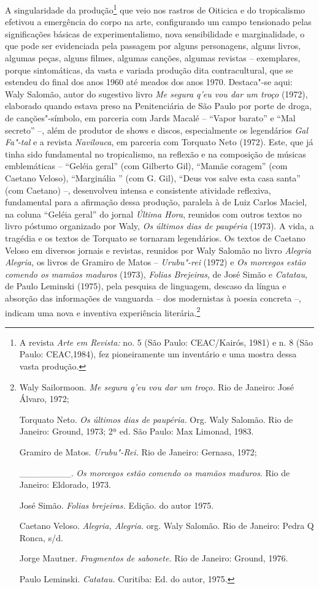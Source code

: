 A singularidade da produção\footnote{A revista \emph{Arte em Revista:}
  no. 5 (São Paulo: \textsc{CEAC}/Kairós, 1981) e n. 8 (São Paulo: \textsc{CEAC},1984),
  fez pioneiramente um inventário e uma mostra dessa vasta produção.}
que veio nos rastros de Oiticica e do tropicalismo efetivou a emergência
do corpo na arte, configurando um campo tensionado pelas significações
básicas de experimentalismo, nova sensibilidade e marginalidade, o que
pode ser evidenciada pela passagem por alguns personagens, alguns
livros, algumas peças, alguns filmes, algumas canções, algumas revistas
-- exemplares, porque sintomáticas, da vasta e variada produção dita
contracultural, que se estendeu do final dos anos 1960 até meados dos
anos 1970. Destaca"-se aqui: Waly Salomão, autor do sugestivo livro
\emph{Me segura q'eu vou dar um troço} (1972), elaborado quando
estava preso na Penitenciária de São Paulo por porte de droga, de
canções"-símbolo, em parceria com Jards Macalé -- ``Vapor barato'' e ``Mal
secreto'' --, além de produtor de shows e discos, especialmente os
legendários \emph{Gal Fa"-tal} e a revista \emph{Navilouca}, em parceria
com Torquato Neto (1972). Este, que já tinha sido fundamental no
tropicalismo, na reflexão e na composição de músicas emblemáticas --
``Geléia geral'' (com Gilberto Gil), ``Mamãe coragem'' (com Caetano
Veloso), ``Marginália '' (com G. Gil), ``Deus vos salve esta casa
santa'' (com Caetano) --, desenvolveu intensa e consistente atividade
reflexiva, fundamental para a afirmação dessa produção, paralela à de
Luiz Carlos Maciel, na coluna ``Geléia geral'' do jornal \emph{Última
Hora}, reunidos com outros textos no livro póstumo organizado por Waly,
\emph{Os últimos dias de paupéria} (1973). A vida, a tragédia e os
textos de Torquato se tornaram legendários. Os textos de Caetano Veloso
em diversos jornais e revistas, reunidos por Waly Salomão no livro
\emph{Alegria Alegria,} os livros de Gramiro de Matos --
\emph{Urubu"-rei} (1972) e \emph{Os morcegos estão comendo os mamãos
maduros} (1973), \emph{Folias Brejeiras}, de José Simão e
\emph{Catatau}, de Paulo Leminski (1975), pela pesquisa de linguagem,
descaso da língua e absorção das informações de vanguarda -- dos
modernistas à poesia concreta --, indicam uma nova e inventiva
experiência literária.\footnote{Waly Sailormoon. \emph{Me segura q'eu
  vou dar um troço.} Rio de Janeiro: José Álvaro, 1972;

  Torquato Neto. \emph{Os últimos dias de paupéria.} Org. Waly Salomão.
  Rio de Janeiro: Ground, 1973; 2ª ed. São Paulo: Max Limonad, 1983.

  Gramiro de Matos. \emph{Urubu"-Rei.} Rio de Janeiro: Gernasa, 1972;

  \_\_\_\_\_\_\_\_. \emph{Os morcegos estão comendo os mamãos maduros}.
  Rio de Janeiro: Eldorado, 1973.

  José Simão. \emph{Folias brejeiras.} Edição. do autor 1975.

  Caetano Veloso. \emph{Alegria, Alegria.} org. Waly Salomão. Rio de
  Janeiro: Pedra Q Ronca, s/d.

  Jorge Mautner. \emph{Fragmentos de sabonete.} Rio de Janeiro: Ground,
  1976.

  Paulo Leminski. \emph{Catatau.} Curitiba: Ed. do autor, 1975.}

